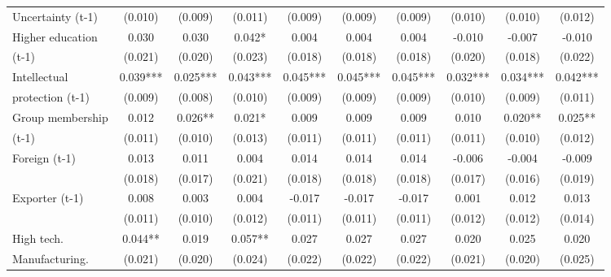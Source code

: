 \begin{table}[htbp]
\begin{tabular}{l*{9}{c}}
Uncertainty (t-1)   &     (0.010)   &     (0.009)   &     (0.011)   &     (0.009)   &     (0.009)   &     (0.009)   &     (0.010)   &     (0.010)   &     (0.012)   \\
Higher education    &       0.030   &       0.030   &       0.042*  &       0.004   &       0.004   &       0.004   &      -0.010   &      -0.007   &      -0.010   \\
(t-1)               &     (0.021)   &     (0.020)   &     (0.023)   &     (0.018)   &     (0.018)   &     (0.018)   &     (0.020)   &     (0.018)   &     (0.022)   \\
Intellectual        &       0.039***&       0.025***&       0.043***&       0.045***&       0.045***&       0.045***&       0.032***&       0.034***&       0.042***\\
protection (t-1)    &     (0.009)   &     (0.008)   &     (0.010)   &     (0.009)   &     (0.009)   &     (0.009)   &     (0.010)   &     (0.009)   &     (0.011)   \\
Group membership    &       0.012   &       0.026** &       0.021*  &       0.009   &       0.009   &       0.009   &       0.010   &       0.020** &       0.025** \\
(t-1)               &     (0.011)   &     (0.010)   &     (0.013)   &     (0.011)   &     (0.011)   &     (0.011)   &     (0.011)   &     (0.010)   &     (0.012)   \\
Foreign (t-1)       &       0.013   &       0.011   &       0.004   &       0.014   &       0.014   &       0.014   &      -0.006   &      -0.004   &      -0.009   \\
                    &     (0.018)   &     (0.017)   &     (0.021)   &     (0.018)   &     (0.018)   &     (0.018)   &     (0.017)   &     (0.016)   &     (0.019)   \\
Exporter (t-1)      &       0.008   &       0.003   &       0.004   &      -0.017   &      -0.017   &      -0.017   &       0.001   &       0.012   &       0.013   \\
                    &     (0.011)   &     (0.010)   &     (0.012)   &     (0.011)   &     (0.011)   &     (0.011)   &     (0.012)   &     (0.012)   &     (0.014)   \\
High tech.          &       0.044** &       0.019   &       0.057** &       0.027   &       0.027   &       0.027   &       0.020   &       0.025   &       0.020   \\
Manufacturing.      &     (0.021)   &     (0.020)   &     (0.024)   &     (0.022)   &     (0.022)   &     (0.022)   &     (0.021)   &     (0.020)   &     (0.025)   \\

\end{tabular}
\end{table}
